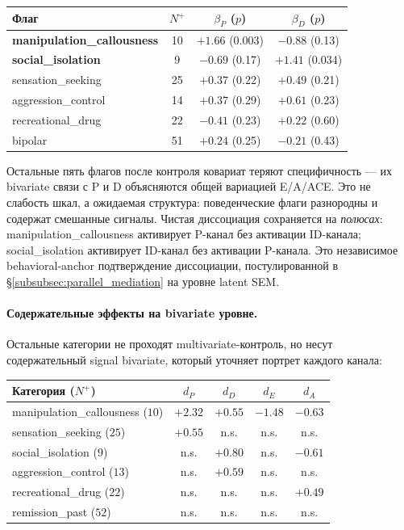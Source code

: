 \begin{center}
\begin{tabular}{lccc}
\toprule
Флаг & $N^+$ & $\beta_P$ ($p$) & $\beta_D$ ($p$) \\
\midrule
\textbf{manipulation\_callousness} & 10 & $\mathbf{+1.66}$ (0.003) & $-0.88$ (0.13) \\
\textbf{social\_isolation}          &  9 & $-0.69$ (0.17)          & $\mathbf{+1.41}$ (0.034) \\
sensation\_seeking                 & 25 & $+0.37$ (0.22)          & $+0.49$ (0.21) \\
aggression\_control                & 14 & $+0.37$ (0.29)          & $+0.61$ (0.23) \\
recreational\_drug                 & 22 & $-0.41$ (0.23)          & $+0.22$ (0.60) \\
bipolar                            & 51 & $+0.24$ (0.25)          & $-0.21$ (0.43) \\
\bottomrule
\end{tabular}
\end{center}

Остальные пять флагов после контроля ковариат теряют специфичность --- их bivariate связи с P и D объясняются общей вариацией E/A/ACE. Это не слабость шкал, а ожидаемая структура: поведенческие флаги разнородны и содержат смешанные сигналы. Чистая диссоциация сохраняется на \emph{полюсах}: manipulation\_callousness активирует P-канал без активации ID-канала; social\_isolation активирует ID-канал без активации P-канала. Это независимое behavioral-anchor подтверждение диссоциации, постулированной в §\ref{subsubsec:parallel_mediation} на уровне latent SEM.

\paragraph{Содержательные эффекты на bivariate уровне.} Остальные категории не проходят multivariate-контроль, но несут содержательный signal bivariate, который уточняет портрет каждого канала:

\begin{center}
\begin{tabular}{lcccc}
\toprule
Категория ($N^+$) & $d_P$ & $d_D$ & $d_E$ & $d_A$ \\
\midrule
manipulation\_callousness ($10$)   & $+2.32$ & $+0.55$ & $-1.48$ & $-0.63$ \\
sensation\_seeking ($25$)          & $+0.55$ & n.s.    & n.s.    & n.s.    \\
social\_isolation ($9$)            & n.s.    & $+0.80$ & n.s.    & $-0.61$ \\
aggression\_control ($13$)         & n.s.    & $+0.59$ & n.s.    & n.s.    \\
recreational\_drug ($22$)          & n.s.    & n.s.    & n.s.    & $+0.49$ \\
remission\_past ($52$)             & n.s.    & n.s.    & n.s.    & n.s.    \\
\bottomrule
\end{tabular}
\end{center}

